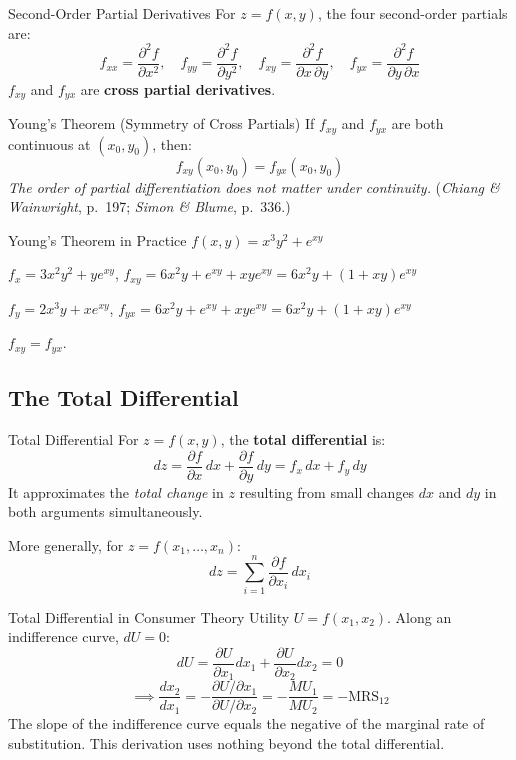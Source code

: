 \documentclass[12pt, a4paper]{article}
\theoremstyle{definition}
\newcommand{\pp}[2]{\dfrac{\partial #1}{\partial #2}}
\newcommand{\ppp}[2]{\dfrac{\partial^2 #1}{\partial #2^2}}
\newcommand{\ppmix}[3]{\dfrac{\partial^2 #1}{\partial #2\,\partial #3}}
\begin{document}
\begin{defbox}{Second-Order Partial Derivatives}
For $z = f(x,y)$, the four second-order partials are:
\[
  f_{xx} = \ppp{f}{x}, \quad
  f_{yy} = \ppp{f}{y}, \quad
  f_{xy} = \ppmix{f}{x}{y}, \quad
  f_{yx} = \ppmix{f}{y}{x}
\]
$f_{xy}$ and $f_{yx}$ are \textbf{cross partial derivatives}.
\end{defbox}

\begin{thmbox}{Young's Theorem (Symmetry of Cross Partials)}
If $f_{xy}$ and $f_{yx}$ are both continuous at $(x_0,y_0)$, then:
\[
  f_{xy}(x_0,y_0) = f_{yx}(x_0,y_0)
\]
\emph{The order of partial differentiation does not matter under continuity.}
(\textit{Chiang \& Wainwright}, p.\ 197; \textit{Simon \& Blume}, p.\ 336.)
\end{thmbox}

\begin{exbox}{Young's Theorem in Practice}
$f(x,y) = x^3 y^2 + e^{xy}$

$f_x = 3x^2y^2 + ye^{xy}$, \quad
$f_{xy} = 6x^2y + e^{xy} + xye^{xy} = 6x^2y + (1+xy)e^{xy}$

$f_y = 2x^3y + xe^{xy}$, \quad
$f_{yx} = 6x^2y + e^{xy} + xye^{xy} = 6x^2y + (1+xy)e^{xy}$

$f_{xy} = f_{yx}$. \checkmark
\end{exbox}

\subsection{The Total Differential}

\begin{defbox}{Total Differential}
For $z = f(x,y)$, the \textbf{total differential} is:
\[
  dz = \pp{f}{x}\,dx + \pp{f}{y}\,dy = f_x\,dx + f_y\,dy
\]
It approximates the \emph{total change} in $z$ resulting from small changes
$dx$ and $dy$ in both arguments simultaneously.

More generally, for $z = f(x_1,\ldots,x_n)$:
\[
  dz = \sum_{i=1}^n \pp{f}{x_i}\,dx_i
\]
\end{defbox}

\begin{exbox}{Total Differential in Consumer Theory}
Utility $U = f(x_1, x_2)$.  Along an indifference curve, $dU = 0$:
\[
  dU = \pp{U}{x_1}dx_1 + \pp{U}{x_2}dx_2 = 0
\]
\[
  \implies \frac{dx_2}{dx_1} = -\frac{\partial U/\partial x_1}{\partial U/\partial x_2}
                              = -\frac{MU_1}{MU_2} = -\text{MRS}_{12}
\]
The slope of the indifference curve equals the negative of the marginal rate
of substitution.  This derivation uses nothing beyond the total differential.
\end{exbox}
\end{document}
